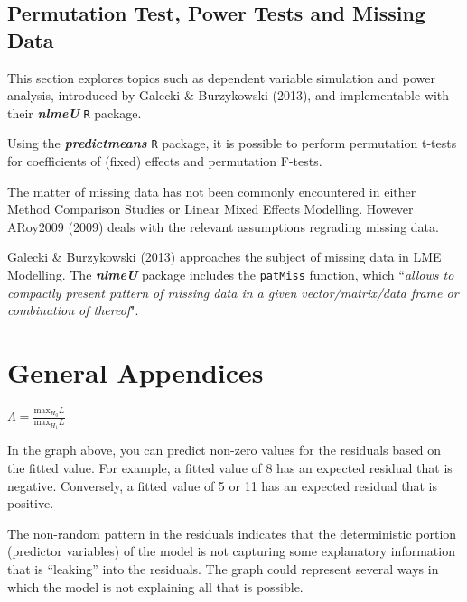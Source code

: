 \documentclass[12pt, a4paper]{report}
\theoremstyle{plain}
\theoremstyle{definition}
\theoremstyle{remark}
\begin{document}
	\section*{Permutation Test, Power Tests and Missing Data }
	
	This section explores topics such as dependent variable simulation and power analysis, introduced by Galecki \& Burzykowski (2013), and implementable with their \textbf{\textit{nlmeU}} \texttt{R} package.
	
	Using the \textbf{\textit{predictmeans}} \texttt{R} package, it is possible to perform permutation t-tests for coefficients of (fixed) effects and permutation F-tests.
	
	The matter of missing data has not been commonly encountered in either Method Comparison Studies or Linear Mixed Effects Modelling. However ARoy2009 (2009) deals with the relevant assumptions regrading missing data. 
	
	Galecki \& Burzykowski (2013) approaches the subject of missing data in LME Modelling. The \textbf{\textit{nlmeU}} package includes the \texttt{patMiss} function, which ``\textit{allows to compactly present pattern of missing data in a given vector/matrix/data
		frame or combination of thereof}".
	
	
	
	\chapter{General Appendices}
	$\Lambda = \frac{\mbox{max}_{H_{0}}L}{\mbox{max}_{H_{1}}L}$
	
	
	
	
	In the graph above, you can predict non-zero values for the residuals based on the fitted value. For example, a fitted value of 8 has an expected residual that is negative. Conversely, a fitted value of 5 or 11 has an expected residual that is positive.
	
	The non-random pattern in the residuals indicates that the deterministic portion (predictor variables) of the model is not capturing some explanatory information that is “leaking” into the residuals. The graph could represent several ways in which the model is not explaining all that is possible. 
	
\end{document}
